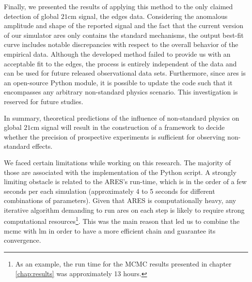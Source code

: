 \documentclass[12pt, TexShade, letterpaper]{report}
\begin{document}
Finally, we presented the results of applying this method to the only claimed detection of global $\mathrm{21cm}$ signal, the \gls{edges} data. Considering the anomalous amplitude and shape of the reported signal and the fact that the current version of our simulator \gls{ares} only contains the standard mechanisms, the output best-fit curve includes notable discrepancies with respect to the overall behavior of the empirical data. Although the developed method failed to provide us with an acceptable fit to the \gls{edges}, the process is entirely independent of the data and can be used for future released observational data sets. Furthermore, since \gls{ares} is an open-source Python module, it is possible to update the code such that it encompasses any arbitrary non-standard physics scenario. This investigation is reserved for future studies.\par

In summary, theoretical predictions of the influence of non-standard physics on global $\mathrm{21cm}$ signal will result in the construction of a framework to decide whether the precision of prospective experiments is sufficient for observing non-standard effects.\par

We faced certain limitations while working on this research. The majority of those are associated with the implementation of the Python script. 
A strongly limiting obstacle is related to the ARES's run-time, which is in the order of a few seconds per each simulation (approximately 4 to 5 seconds for different combinations of parameters). Given that ARES is computationally heavy, any iterative algorithm demanding to run \gls{ares} on each step is likely to require strong computational resources\footnote{ As an example, the run time for the MCMC results presented in chapter \ref{chap:results} was approximately 13 hours.}. This was the main reason that led us to combine the \gls{mcmc} with \gls{lm} in order to have a more efficient chain and guarantee its convergence.\par 
\end{document}

